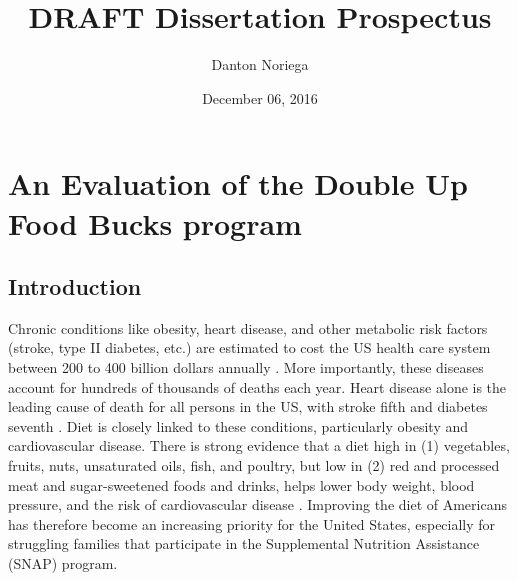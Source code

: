 \documentclass[12pt,letterpaperpaper,]{book}
\title{DRAFT Dissertation Prospectus}
\author{Danton Noriega}
\date{December 06, 2016}
\begin{document}
\maketitle

\setlength{\abovedisplayskip}{-5pt}
\setlength{\abovedisplayshortskip}{-5pt}
\mainmatter

{
\setcounter{tocdepth}{2}
\tableofcontents
}
\chapter{An Evaluation of the Double Up Food Bucks
program}\label{chapter-1}

\section*{Introduction}\label{intro-1}

Chronic conditions like obesity, heart disease, and other metabolic risk
factors (stroke, type II diabetes, etc.) are estimated to cost the US
health care system between 200 to 400 billion dollars annually
\citep{cawley_medical_2012, chatterjee_checkup_2014}. More importantly,
these diseases account for hundreds of thousands of deaths each year.
Heart disease alone is the leading cause of death for all persons in the
US, with stroke fifth and diabetes seventh
\citep{national_center_for_health_statistics_health_2015}. Diet is
closely linked to these conditions, particularly obesity and
cardiovascular disease. There is strong evidence that a diet high in (1)
vegetables, fruits, nuts, unsaturated oils, fish, and poultry, but low
in (2) red and processed meat and sugar-sweetened foods and drinks,
helps lower body weight, blood pressure, and the risk of cardiovascular
disease
\citep{mente_systematic_2009, nutrition_evidence_library_series_2014}.
Improving the diet of Americans has therefore become an increasing
priority for the United States, especially for struggling families that
participate in the Supplemental Nutrition Assistance (SNAP) program.
\end{document}
